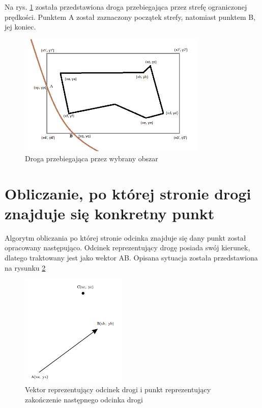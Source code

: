 Na rys. \ref{sec:minBoundingBoxWay} została przedstawiona droga przebiegająca przez strefę ograniczonej prędkości. Punktem A został zaznaczony początek strefy, natomiast punktem B, jej koniec. 
\begin{figure}[h]
\caption{Droga przebiegająca przez wybrany obszar}
\label{sec:minBoundingBoxWay}
\centering
\includegraphics[width=0.8\textwidth]{minBoundingBoxWay}
\end{figure}

\newpage

\section{Obliczanie, po której stronie drogi znajduje się konkretny punkt}
\label{sec:VectorWay}
Algorytm obliczania po której stronie odcinka znajduje się dany punkt został opracowany następująco. Odcinek reprezentujący drogę posiada swój kierunek, dlatego traktowany jest jako wektor AB. Opisana sytuacja została przedstawiona na rysunku \ref{sec:VectorPoint}


\begin{figure}[h]
\caption{Vektor reprezentujący odcinek drogi i punkt reprezentujący zakończenie następnego odcinka drogi}
\label{sec:VectorPoint}
\centering
\includegraphics[width=0.45\textwidth]{vectorPoint}
\end{figure}


